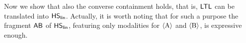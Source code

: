 





Now we show that also the converse containment holds, that is, $\text{\sffamily LTL}$ can be translated into $\text{\sffamily HS}_{\mathsf{lin}}$.
Actually, it is worth noting that for such a purpose the fragment $\mathsf{A}\mathsf{B}$ of $\text{\sffamily HS}_{\mathsf{lin}}$, featuring only modalities for $\operatorname{\langle A\rangle}$ and $\operatorname{\langle B\rangle}$, is expressive enough.

